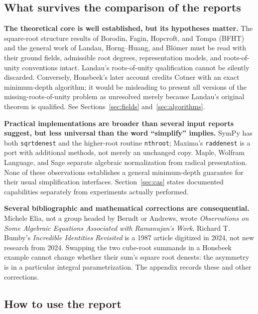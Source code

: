 \documentclass[11pt,a4paper]{article}
\theoremstyle{definition}
\theoremstyle{remark}
\numberwithin{equation}{section}
\begin{document}
\subsection{What survives the comparison of the reports}

\textbf{The theoretical core is well established, but its hypotheses matter.}
The square-root structure results of Borodin, Fagin, Hopcroft, and Tompa (BFHT) and the general work of Landau, Horng--Huang, and Bl\"omer must be read with their ground fields, admissible root degrees, representation models, and roots-of-unity conventions intact. Landau's roots-of-unity qualification cannot be silently discarded. Conversely, Honsbeek's later account credits Cotner with an exact minimum-depth algorithm; it would be misleading to present all versions of the missing-roots-of-unity problem as unresolved merely because Landau's original theorem is qualified. See Sections~\ref{sec:fields} and~\ref{sec:algorithms}.\cite{bfht,zippel,landau,horng1999,blomer2000,honsbeek2005,cotner}

\textbf{Practical implementations are broader than several input reports suggest, but less universal than the word ``simplify'' implies.}
SymPy has both \texttt{sqrtdenest} and the higher-root routine \texttt{nthroot}; Maxima's \texttt{raddenest} is a port with additional methods, not merely an unchanged copy. Maple, Wolfram Language, and Sage separate algebraic normalization from radical presentation. None of these observations establishes a general minimum-depth guarantee for their usual simplification interfaces. Section~\ref{sec:cas} states documented capabilities separately from experiments actually performed.\cite{sympydocs,sympysource,maximaraddenest,mapleradnormal,wolframroot,wolframtoradicals,sageqqbar}

\textbf{Several bibliographic and mathematical corrections are consequential.}
Michele Elia, not a group headed by Berndt or Andrews, wrote \emph{Observations on Some Algebraic Equations Associated with Ramanujan's Work}. Richard T. Bumby's \emph{Incredible Identities Revisited} is a 1987 article digitized in 2024, not new research from 2024. Swapping the two cube-root summands in a Honsbeek example cannot change whether their sum's square root denests: the asymmetry is in a particular integral parametrization. The appendix records these and other corrections.\cite{elia,bumby,honsbeek2005,sury}

\subsection{How to use the report}
\end{document}
